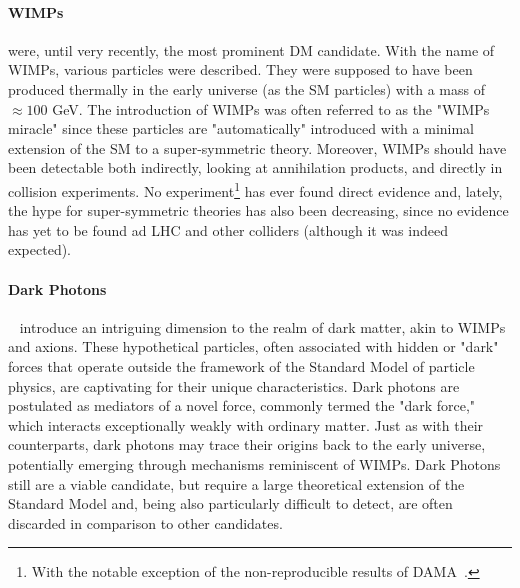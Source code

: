 \paragraph{WIMPs} were, until very recently, the most prominent DM candidate. With the name of WIMPs, various particles were described. They were supposed to have been produced thermally in the early universe (as the SM particles) with a mass of $\approx 100$ GeV. The introduction of WIMPs was often referred to as the "WIMPs miracle" since these particles are "automatically" introduced with a minimal extension of the SM to a super-symmetric theory. Moreover, WIMPs should have been detectable both indirectly, looking at annihilation products, and directly in collision experiments. No experiment\footnote{With the notable exception of the non-reproducible results of DAMA~\cite{Petriello2008}.} has ever found direct evidence and, lately, the hype for super-symmetric theories has also been decreasing, since no evidence has yet to be found ad LHC and other colliders (although it was indeed expected).

\paragraph{Dark Photons}~\cite{Caputo2021} introduce an intriguing dimension to the realm of dark matter, akin to WIMPs and axions. These hypothetical particles, often associated with hidden or "dark" forces that operate outside the framework of the Standard Model of particle physics, are captivating for their unique characteristics. Dark photons are postulated as mediators of a novel force, commonly termed the "dark force," which interacts exceptionally weakly with ordinary matter. Just as with their counterparts, dark photons may trace their origins back to the early universe, potentially emerging through mechanisms reminiscent of WIMPs.
Dark Photons still are a viable candidate, but require a large theoretical extension of the Standard Model and, being also particularly difficult to detect, are often discarded in comparison to other candidates. 

